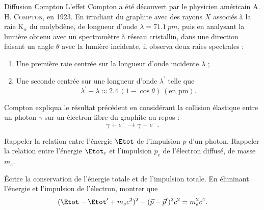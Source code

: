 \begin{exo}[PC][2][TD]{Diffusion Compton}
  L'effet Compton a été découvert par le physicien américain A. H. \textsc{Compton}, en 1923. En irradiant du graphite avec des rayons $X$ associés à la raie $\mathrm{K}_\alpha$ du molybdène, de longueur d'onde $\lambda = \SI{71,1}{pm}$, puis en analysant la lumière obtenu avec un spectromètre à réseau cristallin, dans une direction faisant un angle $\theta$ avec la lumière incidente, il observa deux raies spectrales :
  \begin{enumerate}
    \item Une première raie centrée sur la longueur d'onde incidente $\lambda$ ;
    \item Une seconde centrée sur une longueur d'onde $\lambda^{\prime}$ telle que 
    \begin{equation}\label{eq:compton}
      \lambda^{\prime}-\lambda \approx \num{2,4}\, (1 - \cos \theta) ~(\text{en pm}).
    \end{equation}
  \end{enumerate}
  Compton expliqua le résultat précédent en considérant la collision élastique entre un photon $\gamma$ sur un électron libre du graphite au repos :
  \begin{equation}
    \gamma+e^{-} \rightarrow \gamma+e^{-}.
  \end{equation}
  \begin{quest}
    \item	Rappeler la relation entre l'énergie $\Etot$  de l'impulsion $p$ d'un photon. Rappeler la relation entre l'énergie $\Etot_e$ et l'impulsion $p_e$ de l'électron diffusé, de masse $m_e$.
    \item Écrire la conservation de l'énergie totale et de l'impulsion totale. En éliminant l'énergie et l'impulsion de l'électron, montrer que 
     \begin{equation}
      (\Etot -\Etot' + m_e c^2)^2 - (\Vec{p} - \Vec{p}')^2c^2 = m_e^2c^4 .  
    \end{equation}
\end{quest}
\end{exo}
